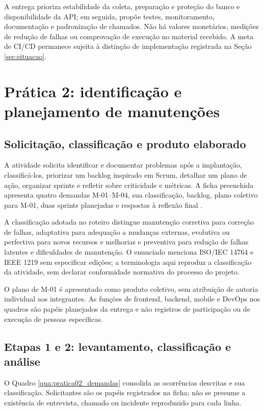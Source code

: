 A entrega prioriza estabilidade da coleta, preparação e proteção do banco e disponibilidade da API; em seguida, propõe testes, monitoramento, documentação e padronização de chamados. Não há valores monetários, medições de redução de falhas ou comprovação de execução no material recebido. A meta de CI/CD permanece sujeita à distinção de implementação registrada na Seção \ref{sec:situacao}.

\section{Prática 2: identificação e planejamento de manutenções}\label{sec:pratica02}

\subsection{Solicitação, classificação e produto elaborado}

A atividade solicita identificar e documentar problemas após a implantação, classificá-los, priorizar um backlog inspirado em Scrum, detalhar um plano de ação, organizar sprints e refletir sobre criticidade e métricas. A ficha preenchida apresenta quatro demandas M-01--M-04, sua classificação, backlog, plano coletivo para M-01, duas sprints planejadas e respostas à reflexão final \cite{pratica02}.

A classificação adotada no roteiro distingue manutenção corretiva para correção de falhas, adaptativa para adequação a mudanças externas, evolutiva ou perfectiva para novos recursos e melhorias e preventiva para redução de falhas latentes e dificuldades de manutenção. O enunciado menciona ISO/IEC 14764 e IEEE 1219 sem especificar edições; a terminologia aqui reproduz a classificação da atividade, sem declarar conformidade normativa do processo do projeto.

O plano de M-01 é apresentado como produto coletivo, sem atribuição de autoria individual aos integrantes. As funções de frontend, backend, mobile e DevOps nos quadros são papéis planejados da entrega e não registros de participação ou de execução de pessoas específicas.

\subsection{Etapas 1 e 2: levantamento, classificação e análise}

O Quadro \ref{qua:pratica02_demandas} consolida as ocorrências descritas e sua classificação. Solicitantes são os papéis registrados na ficha; não se presume a existência de entrevista, chamado ou incidente reproduzido para cada linha.

